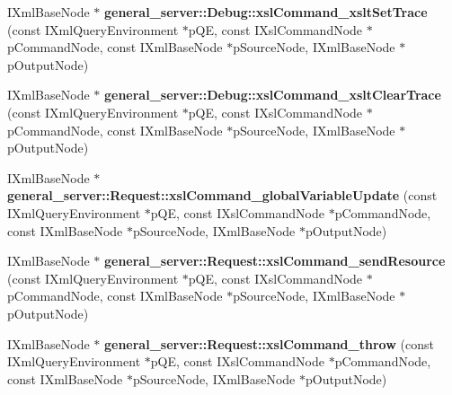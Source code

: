 \begin{DoxyCompactItemize}
\item 
\hypertarget{group__XSLModule-Commands_ga15bc1ae75d76acc84908a51a4df8300a}{\-I\-Xml\-Base\-Node $\ast$ {\bfseries general\-\_\-server\-::\-Debug\-::xsl\-Command\-\_\-xslt\-Set\-Trace} (const \-I\-Xml\-Query\-Environment $\ast$p\-Q\-E, const \-I\-Xsl\-Command\-Node $\ast$p\-Command\-Node, const \-I\-Xml\-Base\-Node $\ast$p\-Source\-Node, \-I\-Xml\-Base\-Node $\ast$p\-Output\-Node)}\label{group__XSLModule-Commands_ga15bc1ae75d76acc84908a51a4df8300a}

\item 
\hypertarget{group__XSLModule-Commands_ga1a2267db41d4f903417dfac6443eb683}{\-I\-Xml\-Base\-Node $\ast$ {\bfseries general\-\_\-server\-::\-Debug\-::xsl\-Command\-\_\-xslt\-Clear\-Trace} (const \-I\-Xml\-Query\-Environment $\ast$p\-Q\-E, const \-I\-Xsl\-Command\-Node $\ast$p\-Command\-Node, const \-I\-Xml\-Base\-Node $\ast$p\-Source\-Node, \-I\-Xml\-Base\-Node $\ast$p\-Output\-Node)}\label{group__XSLModule-Commands_ga1a2267db41d4f903417dfac6443eb683}

\item 
\hypertarget{group__XSLModule-Commands_gae7356522b87a3d9d831581d48617bcc5}{\-I\-Xml\-Base\-Node $\ast$ {\bfseries general\-\_\-server\-::\-Request\-::xsl\-Command\-\_\-global\-Variable\-Update} (const \-I\-Xml\-Query\-Environment $\ast$p\-Q\-E, const \-I\-Xsl\-Command\-Node $\ast$p\-Command\-Node, const \-I\-Xml\-Base\-Node $\ast$p\-Source\-Node, \-I\-Xml\-Base\-Node $\ast$p\-Output\-Node)}\label{group__XSLModule-Commands_gae7356522b87a3d9d831581d48617bcc5}

\item 
\hypertarget{group__XSLModule-Commands_ga62b874e4b02db54a71d23c1dae1932bb}{\-I\-Xml\-Base\-Node $\ast$ {\bfseries general\-\_\-server\-::\-Request\-::xsl\-Command\-\_\-send\-Resource} (const \-I\-Xml\-Query\-Environment $\ast$p\-Q\-E, const \-I\-Xsl\-Command\-Node $\ast$p\-Command\-Node, const \-I\-Xml\-Base\-Node $\ast$p\-Source\-Node, \-I\-Xml\-Base\-Node $\ast$p\-Output\-Node)}\label{group__XSLModule-Commands_ga62b874e4b02db54a71d23c1dae1932bb}

\item 
\hypertarget{group__XSLModule-Commands_ga027f59c9cf28596905d61af8a9dd08b1}{\-I\-Xml\-Base\-Node $\ast$ {\bfseries general\-\_\-server\-::\-Request\-::xsl\-Command\-\_\-throw} (const \-I\-Xml\-Query\-Environment $\ast$p\-Q\-E, const \-I\-Xsl\-Command\-Node $\ast$p\-Command\-Node, const \-I\-Xml\-Base\-Node $\ast$p\-Source\-Node, \-I\-Xml\-Base\-Node $\ast$p\-Output\-Node)}\label{group__XSLModule-Commands_ga027f59c9cf28596905d61af8a9dd08b1}


\end{DoxyCompactItemize}
